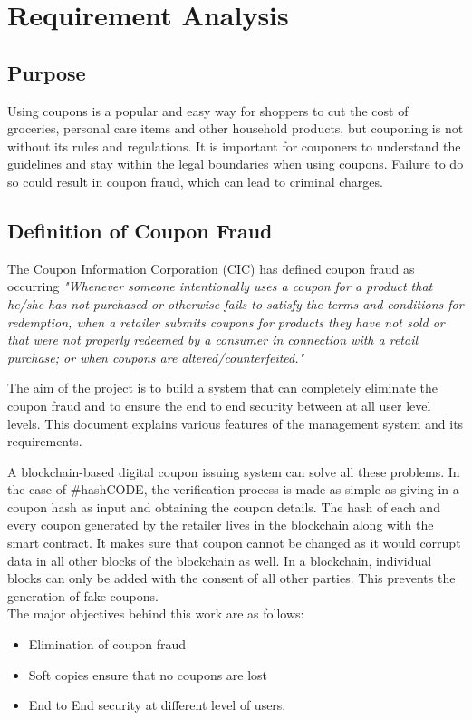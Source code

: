 \chapter{Requirement Analysis}
\section{Purpose}
\par
Using coupons is a popular and easy way for shoppers to cut the cost of
groceries, personal care items and other household products, but couponing is not
without its rules and regulations. It is important for couponers to understand the
guidelines and stay within the legal boundaries when using coupons. Failure to
do so could result in coupon fraud, which can lead to criminal charges.

\section{Definition of Coupon Fraud}
The Coupon Information Corporation (CIC) has defined coupon fraud as
occurring \textit{"Whenever someone intentionally uses a coupon for a product that
he/she has not purchased or otherwise fails to satisfy the terms and conditions
for redemption, when a retailer submits coupons for products they have not sold
or that were not properly redeemed by a consumer in connection with a retail
purchase; or when coupons are altered/counterfeited."}
\par
The aim of the project is to build a system that can completely eliminate
the coupon fraud and to ensure the end to end security between at all user level
levels. This document explains various features of the management system and
its requirements.
\par
A blockchain-based digital coupon issuing system can solve all these
problems. In the case of #hashCODE, the verification process is made as simple
as giving in a coupon hash as input and obtaining the coupon details. The hash of
each and every coupon generated by the retailer lives in the blockchain along with
the smart contract. It makes sure that coupon cannot be changed as it would
corrupt data in all other blocks of the blockchain as well. In a blockchain,
individual blocks can only be added with the consent of all other parties. This
prevents the generation of fake coupons.
\\
The major objectives behind this work are as follows:
\begin{itemize}
    \item Elimination of coupon fraud
    \item Soft copies ensure that no coupons are lost 
    \item End to End security at different level of users.
\end{itemize}
